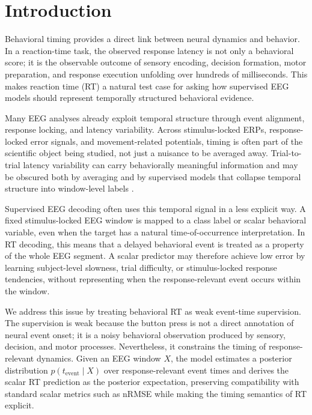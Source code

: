 \documentclass[12pt]{article}
\begin{document}
\section{Introduction}

Behavioral timing provides a direct link between neural dynamics and behavior. In a reaction-time task, the observed response latency is not only a behavioral score; it is the observable outcome of sensory encoding, decision formation, motor preparation, and response execution unfolding over hundreds of milliseconds. This makes reaction time (RT) a natural test case for asking how supervised EEG models should represent temporally structured behavioral evidence.

Many EEG analyses already exploit temporal structure through event alignment, response locking, and latency variability. Across stimulus-locked ERPs, response-locked error signals, and movement-related potentials, timing is often part of the scientific object being studied, not just a nuisance to be averaged away. Trial-to-trial latency variability can carry behaviorally meaningful information and may be obscured both by averaging and by supervised models that collapse temporal structure into window-level labels \citep{Jung1998SingleTrialERP,Ouyang2017LatencyReview}.

Supervised EEG decoding often uses this temporal signal in a less explicit way. A fixed stimulus-locked EEG window is mapped to a class label or scalar behavioral variable, even when the target has a natural time-of-occurrence interpretation. In RT decoding, this means that a delayed behavioral event is treated as a property of the whole EEG segment. A scalar predictor may therefore achieve low error by learning subject-level slowness, trial difficulty, or stimulus-locked response tendencies, without representing when the response-relevant event occurs within the window.

We address this issue by treating behavioral RT as weak event-time supervision. The supervision is weak because the button press is not a direct annotation of neural event onset; it is a noisy behavioral observation produced by sensory, decision, and motor processes. Nevertheless, it constrains the timing of response-relevant dynamics. Given an EEG window \(X\), the model estimates a posterior distribution \(p(t_{\mathrm{event}}\mid X)\) over response-relevant event times and derives the scalar RT prediction as the posterior expectation, preserving compatibility with standard scalar metrics such as nRMSE while making the timing semantics of RT explicit.
\end{document}
